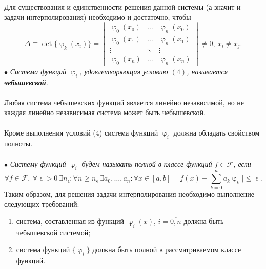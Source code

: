 \documentclass[a4paper, 12pt]{report}
\numberwithin{equation}{section}
\renewcommand{\leq}{\leqslant}
\renewcommand{\geq}{\geqslant}
\renewcommand{\varphi}{\upvarphi}
\renewcommand{\varepsilon}{\upvarepsilon}
\begin{document}
 	 	Для существования и единственности решения данной системы (а значит и задачи интерполирования) необходимо и достаточно, чтобы
 	 	\begin{equation}
 	 		\Delta \equiv \det \{\varphi_k(x_i)\} = \begin{vmatrix}
 	 		\varphi_0(x_0) & \dots & \varphi_n(x_0)\\
 	 		\varphi_0(x_1) & \dots & \varphi_n(x_1)\\
 	 		\vdots & \ddots & \vdots \\
 	 		\varphi_0(x_n) & \dots & \varphi_n(x_n) 
 	 	\end{vmatrix}\ne 0,\ x_i\ne x_j.
 	 	\end{equation}
 	 	$\bullet$ \textit{Система функций $\varphi_i$, удовлетворяющая условию $(4)$, называется \textbf{чебышевской}.}\\\\
	Любая система чебышевских функций является линейно независимой, но не каждая линейно независимая система может быть чебышевской.\\\\
	Кроме выполнения условий (4) система функций ${\varphi_i}$ должна обладать свойством полноты.\\\\
	$\bullet$ \textit{Систему функций ${\varphi_i}$ будем называть полной в классе функций $f \in \mathcal F$, если} $$\forall f\in \mathcal F,\ \forall \varepsilon > 0\ \exists n_\varepsilon : \forall n \geq n_\varepsilon\ \exists a_0,\ldots, a_n : \forall x \in [a,b]\quad \Big|f(x) - \sum_{k=0}^{n}a_k\varphi_k|\leq \varepsilon.$$
	Таким образом, для решения задачи интерполирования необходимо выполнение следующих требований:
	\begin{enumerate}
		\item система, составленная из функций $\varphi_i(x)$, $i=\overline{0,n}$ должна быть чебышевской системой;
		\item система функций $\{\varphi_i\}$ должна быть полной в рассматриваемом классе функций.
	\end{enumerate}
\end{document}
